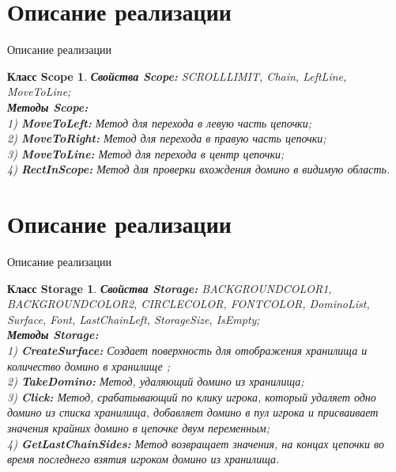 \documentclass[handout]{beamer}
\newtheorem*{classes4}{Класс Scope}
\newtheorem*{classes5}{Класс Storage}
\begin{document}
	\section{Описание реализации}
\begin{frame}{Описание реализации}	
	\begin{classes4}
		\textbf{Свойства Scope:} SCROLLLIMIT, Chain, LeftLine, MoveToLine;\\
		\textbf{Методы Scope:} \\
		1) \textbf{MoveToLeft:} Метод для перехода в левую часть цепочки;\\
		2) \textbf{MoveToRight:}  Метод для перехода в правую часть цепочки;\\
		3) \textbf{MoveToLine:} Метод для перехода в центр цепочки;\\
	    4) \textbf{RectInScope:} Метод для проверки вхождения домино в видимую область.\\		
	\end{classes4}
\end{frame}

\section{Описание реализации}
\begin{frame}{Описание реализации}	
	\begin{classes5}
		\textbf{Свойства Storage:} BACKGROUNDCOLOR1, BACKGROUNDCOLOR2, CIRCLECOLOR, FONTCOLOR, DominoList, Surface, Font, LastChainLeft, StorageSize, IsEmpty;\\
		\textbf{Методы Storage:} \\
		1) \textbf{CreateSurface:} Создает поверхность для отображения хранилища и количество домино в хранилище ;\\
		2) \textbf{TakeDomino:} Метод, удаляющий домино из хранилища;\\
		3) \textbf{Click:} Метод, срабатывающий по клику игрока, который удаляет одно домино из списка хранилища, добавляет домино в пул игрока и присваивает значения крайних домино в цепочке двум переменным;\\
		4) \textbf{GetLastChainSides:} Метод возвращает значения, на концах цепочки во время последнего взятия игроком домино из хранилища.\\		
	\end{classes5}
\end{frame}
\end{document}
